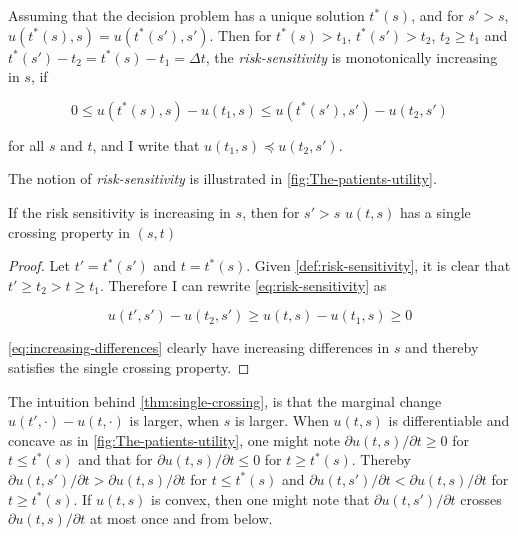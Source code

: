 \documentclass[10pt,a4paper]{article} 					%
\begin{document}
\begin{defn}\label{def:risk-sensitivity}
Assuming that the decision problem has a unique solution $t^{*}(s)$, and for $s'>s$, $u(t^{*}(s),s)=u(t^{*}(s'),s')$. Then for $t^{*}(s)>t_{1}$, $t^{*}(s')>t_{2}$, $t_{2}\ge t_{1}$ and $t^{*}(s')-t_{2}=t^{*}(s)-t_{1}=\Delta t$, the \emph{risk-sensitivity} is monotonically increasing in $s$, if

\[
	0\le u(t^{*}(s),s)-u(t_{1},s)\le u(t^{*}(s'),s')-u(t_{2},s')\label{eq:risk-sensitivity}
\]

for all $s$ and $t$, and I write that $u(t_{1},s)\preceq u(t_{2},s')$.
\end{defn}

The notion of \emph{risk-sensitivity} is illustrated in \cref{fig:The-patients-utility}.

\begin{thm}\label{thm:single-crossing}
If the risk sensitivity is increasing in $s$, then for $s'>s$ $u(t,s)$ has a single crossing property in $(s,t)$
\end{thm}

\begin{proof}
Let $t'=t^{*}(s')$ and $t=t^{*}(s)$. Given \cref{def:risk-sensitivity}, it is clear that $t'\ge t_{2}>t\ge t_{1}$. Therefore I can rewrite \cref{eq:risk-sensitivity} as

\[
	u(t',s')-u(t_{2},s')\ge u(t,s)-u(t_{1},s)\ge0\label{eq:increasing-differences}
\]

\cref{eq:increasing-differences} clearly have increasing differences in $s$ and thereby satisfies the single crossing property.
\end{proof}

The intuition behind \cref{thm:single-crossing}, is that the marginal change $u(t',\cdot)-u(t,\cdot)$ is larger, when $s$ is larger. When $u(t,s)$ is differentiable and concave as in \cref{fig:The-patients-utility}, one might note $\partial u(t,s)/\partial t\ge0$ for $t\le t^{*}(s)$ and that for $\partial u(t,s)/\partial t\le0$ for $t\ge t^{*}(s)$. Thereby $\partial u(t,s')/\partial t>\partial u(t,s)/\partial t$ for $t\le t^{*}(s)$ and $\partial u(t,s')/\partial t<\partial u(t,s)/\partial t$ for $t\ge t^{*}(s)$. If $u(t,s)$ is convex, then one might note that $\partial u(t,s')/\partial t$ crosses $\partial u(t,s)/\partial t$ at most once and from below.
\end{document}
